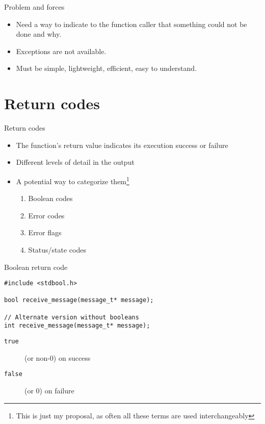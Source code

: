 \documentclass[aspectratio=169,14pt]{beamer}
\begin{document}
\begin{frame}{Problem and forces}
\begin{itemize}
    \item Need a way to indicate to the function caller that something could not be done and why.
    \item Exceptions are not available.
    \item Must be simple, lightweight, efficient, easy to understand.
\end{itemize}
\end{frame}





\section{Return codes}

\begin{frame}{Return codes}
\begin{itemize}
    \item The function's return value indicates its execution success or failure
    \item Different levels of detail in the output
    \item A potential way to categorize them\footnote{This is just my proposal, as often all these terms are used interchangeably}\\
    \begin{enumerate}
        \item Boolean codes
        \item Error codes
        \item Error flags
        \item Status/state codes
    \end{enumerate}
\end{itemize}
\end{frame}



\begin{frame}[fragile]{Boolean return code}
\begin{lstlisting}[style=cstyle]
#include <stdbool.h>

bool receive_message(message_t* message);

// Alternate version without booleans
int receive_message(message_t* message);
\end{lstlisting}

\begin{description}
    \item[\texttt{true}] (or non-0) on success
    \item[\texttt{false}] (or 0) on failure
\end{description}
\end{frame}
\end{document}
